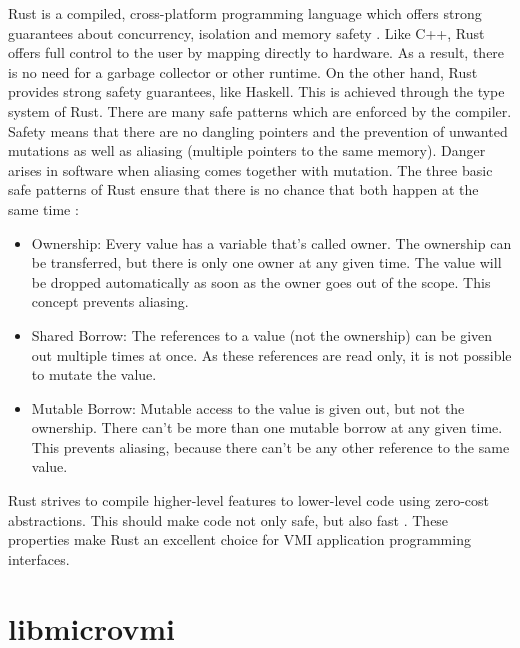 \documentclass[sigconf]{acmart}
\begin{document}
Rust is a compiled, cross-platform programming language which offers strong guarantees about concurrency, isolation and memory safety \cite{matsakis2014rust}. 
\newline
\newline
Like C++, Rust offers full control to the user by mapping directly to hardware. As a result, there is no need for a garbage collector or other runtime. On the other hand, Rust provides strong safety guarantees, like Haskell. This is achieved through the type system of Rust. There are many safe patterns which are enforced by the compiler. Safety means that there are no dangling pointers and the prevention of unwanted mutations as well as aliasing (multiple pointers to the same memory).
\newline
\newline
Danger arises in software when aliasing comes together with mutation. The three basic safe patterns of Rust ensure that there is no chance that both happen at the same time \cite{rustdocumentation}:
\newline
\begin{itemize}
	\item Ownership: Every value has a variable that's called owner. The ownership can be transferred, but there is only one owner at any given time. The value will be dropped automatically as soon as the owner goes out of the scope. This concept prevents aliasing.
	\newline 
	\item Shared Borrow: The references to a value (not the ownership) can be given out multiple times at once. As these references are read only, it is not possible to mutate the value.
	\newline
	\item Mutable Borrow: Mutable access to the value is given out, but not the ownership. There can't be more than one mutable borrow at any given time. This prevents aliasing, because there can't be any other reference to the same value.
	\newline
\end{itemize}
Rust strives to compile higher-level features to lower-level code using zero-cost abstractions. This should make code not only safe, but also fast \cite{klabnik2019rust}.
\newline
\newline
These properties make Rust an excellent choice for VMI application programming interfaces.

\section{libmicrovmi}
\end{document}
